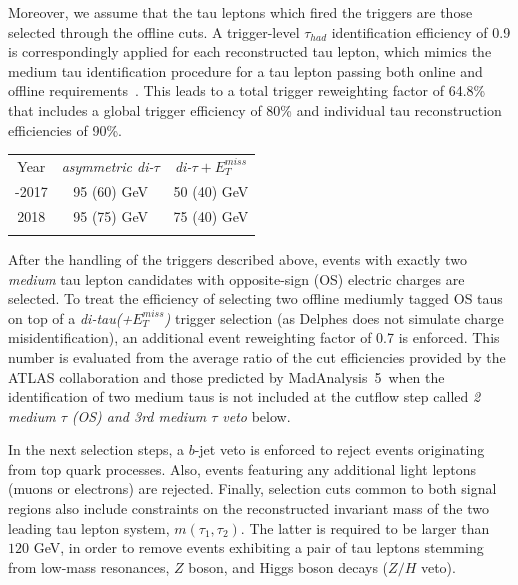 \documentclass{ws-mpla}
\newcommand{\madanalysis}{{\sc MadAnalysis~5}}
\begin{document}
Moreover, we assume that the tau leptons which fired the triggers are those selected through the offline cuts. A trigger-level $\tau_{had}$ identification efficiency of 0.9 is correspondingly applied for each reconstructed tau lepton, which mimics the medium tau identification procedure for a tau lepton passing both online and offline requirements~\cite{ATLAS:2017mpa}.
This leads to a total trigger reweighting factor of 64.8\% that includes a global trigger efficiency of 80\% and individual tau reconstruction efficiencies of 90\%.

\begin{table}[t]
  {\begin{tabular}{@{}c c c@{}} \toprule
  Year & \textit{asymmetric di-$\tau$} & \textit{di-$\tau +E^{miss}_T$} \\
  \colrule
 2015-2017 & 95 (60) GeV & 50 (40) GeV \\
 2018 & 95 (75) GeV & 75 (40) GeV \\ 
  \botrule
  \end{tabular}\label{tab:trig-eff} }
\end{table}

After the handling of the triggers described above, events with exactly two \textit{medium} tau lepton candidates with opposite-sign (OS) electric charges are selected. To treat the efficiency of selecting two offline mediumly tagged OS taus on top of a \textit{di-tau(+$E^{miss}_T$)} trigger selection (as {\sc Delphes} does not simulate charge misidentification), an additional event reweighting factor of 0.7 is enforced.
This number is evaluated from the average ratio of the cut efficiencies provided by the ATLAS collaboration and those predicted by \madanalysis\ when the identification of two medium taus is not included at the cutflow step called \textit{2 medium $\tau$ (OS) and 3rd medium $\tau$ veto} below.

In the next selection steps, a $b$-jet veto is enforced to reject events originating from top quark processes.
Also, events featuring any additional light leptons (muons or electrons) are rejected.
Finally, selection cuts common to both signal regions also include constraints on the reconstructed invariant mass of the two leading tau lepton system, $m(\tau_1,\tau_2)$. The latter is required to be larger than $120$ GeV, in order to remove events exhibiting a pair of tau leptons stemming from low-mass resonances, $Z$ boson, and Higgs boson decays ($Z/H$ veto).
\end{document}
